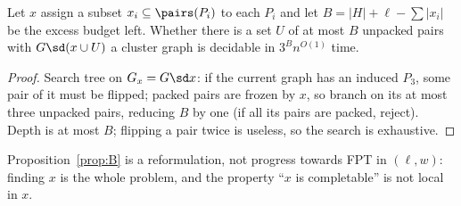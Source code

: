 \begin{proposition}\label{prop:B}
Let $x$ assign a subset $x_i\subseteq\pairs(P_i)$ to each $P_i$ and let $B=|H|+\ell-\sum|x_i|$ be the excess budget left. Whether there is a set $U$ of at most $B$ unpacked pairs with $G\sd(x\cup U)$ a cluster graph is decidable in $3^{B}n^{O(1)}$ time.
\end{proposition}
\begin{proof}
Search tree on $G_x=G\sd x$: if the current graph has an induced $P_3$, some pair of it must be flipped; packed pairs are frozen by $x$, so branch on its at most three unpacked pairs, reducing $B$ by one (if all its pairs are packed, reject). Depth is at most $B$; flipping a pair twice is useless, so the search is exhaustive.
\end{proof}
\begin{remark}
Proposition~\ref{prop:B} is a reformulation, not progress towards FPT in $(\ell,w)$: finding $x$ is the whole problem, and the property ``$x$ is completable'' is not local in $x$.
\end{remark}
